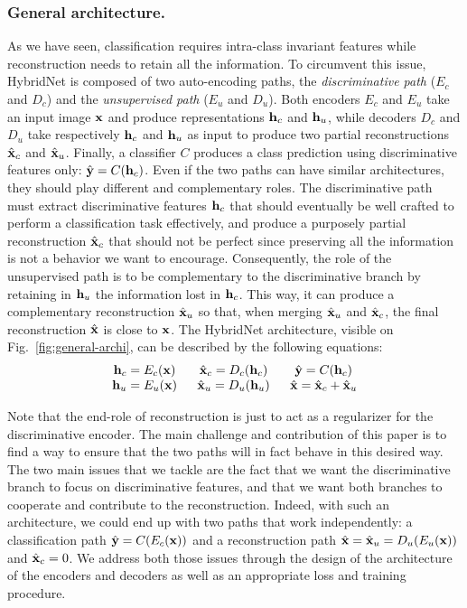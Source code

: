 \documentclass[runningheads]{llncs}
\begin{document}
\subsubsection{General architecture.}
As we have seen, classification requires intra-class invariant features while reconstruction needs to retain all the information. To circumvent this issue, HybridNet is composed of two auto-encoding paths, the \textit{discriminative path} ($E_c$ and $D_c$) and the \textit{unsupervised path} ($E_u$ and $D_u$). Both encoders $E_c$ and $E_u$ take an input image $\mathbf{x}$ and produce representations $\mathbf{h}_c$ and $\mathbf{h}_u$, while decoders $D_c$ and $D_u$ take respectively $\mathbf{h}_c$ and $\mathbf{h}_u$ as input to produce two partial reconstructions $\hat{\mathbf{x}}_c$ and $\hat{\mathbf{x}}_u$. Finally, a classifier $C$ produces a class prediction using discriminative features only: $\hat{\mathbf{y}} = C(\mathbf{h}_c)$. Even if the two paths can have similar architectures, they should play different and complementary roles. The discriminative path must extract discriminative features $\mathbf{h}_c$ that should eventually be well crafted to perform a classification task effectively, and produce a purposely partial reconstruction $\hat{\mathbf{x}}_c$ that should not be perfect since preserving all the information is not a behavior we want to encourage. Consequently, the role of the unsupervised path is to be complementary to the discriminative branch by retaining in $\mathbf{h}_u$ the information lost in $\mathbf{h}_c$. This way, it can produce a complementary reconstruction $\hat{\mathbf{x}}_u$ so that, when merging $\hat{\mathbf{x}}_u$ and $\hat{\mathbf{x}}_c$, the final reconstruction $\hat{\mathbf{x}}$ is close to $\mathbf{x}$. The HybridNet architecture, visible on Fig.~\ref{fig:general-archi}, can be described by the following equations:
\begin{equation}\arraycolsep=8pt
\begin{array}{ccc}
	\vh_c = E_c(\vx) & \vxh_c = D_c(\vh_c) & \vyh = C(\vh_c)\\
	\vh_u = E_u(\vx) & \vxh_u = D_u(\vh_u) & \vxh = \vxh_c + \vxh_u
\end{array}
\end{equation}

Note that the end-role of reconstruction is just to act as a regularizer for the discriminative encoder.
The main challenge and contribution of this paper is to find a way to ensure that the two paths will in fact behave in this desired way. The two main issues that we tackle are the fact that we want the discriminative branch to focus on discriminative features, and that we want both branches to cooperate and contribute to the reconstruction. Indeed, with such an architecture, we could end up with two paths that work independently: a classification path $\hat{\mathbf{y}} = C(E_c(\mathbf{x}))$ and a reconstruction path $\hat{\mathbf{x}} = \hat{\mathbf{x}}_u = D_u(E_u(\mathbf{x}))$ and $\hat{\mathbf{x}}_c = 0$. We address both those issues through the design of the architecture of the encoders and decoders as well as an appropriate loss and training procedure.
\end{document}
